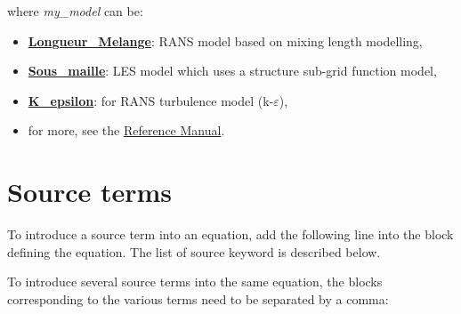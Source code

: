 where \textit{my\_model} can be:
\begin{itemize}
\item \href{\REFERENCEMANUAL\#longueurmelange}{\textbf{Longueur\_Melange}}: RANS model based on mixing length modelling,
\item \href{\REFERENCEMANUAL\#sousmaille}{\textbf{Sous\_maille}}: LES model which uses a structure sub-grid function model,
\item \href{\REFERENCEMANUAL\#kepsilon}{\textbf{K\_epsilon}}: for RANS turbulence model (k-$\varepsilon$),
\item for more, see the \href{\REFERENCEMANUAL\#modeleturbulencehydderiv}{\trustref Reference Manual}.
\end{itemize}




\section{Source terms}
To introduce a source term into an equation, add the following line into the block defining the equation. The list of source keyword is described below.
\begin{center}
\end{center}

To introduce several source terms into the same equation, the blocks corresponding to the various terms need to be separated by a comma:
\begin{center}
\end{center}

